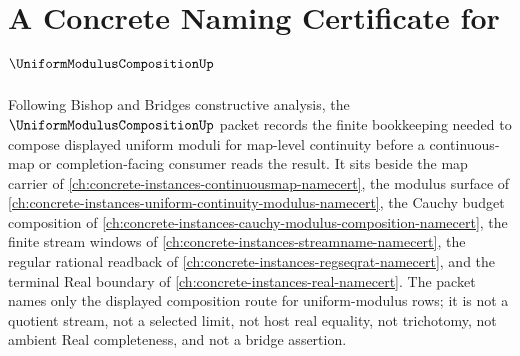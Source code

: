\chapter{A Concrete Naming Certificate for $\UniformModulusCompositionUp$}
\label{ch:concrete-instances-uniform-modulus-composition-namecert}

Following Bishop and Bridges constructive analysis, the $\UniformModulusCompositionUp$ packet records the finite bookkeeping needed to compose displayed uniform moduli for map-level continuity before a continuous-map or completion-facing consumer reads the result. It sits beside the map carrier of \autoref{ch:concrete-instances-continuousmap-namecert}, the modulus surface of \autoref{ch:concrete-instances-uniform-continuity-modulus-namecert}, the Cauchy budget composition of \autoref{ch:concrete-instances-cauchy-modulus-composition-namecert}, the finite stream windows of \autoref{ch:concrete-instances-streamname-namecert}, the regular rational readback of \autoref{ch:concrete-instances-regseqrat-namecert}, and the terminal Real boundary of \autoref{ch:concrete-instances-real-namecert}. The packet names only the displayed composition route for uniform-modulus rows; it is not a quotient stream, not a selected limit, not host real equality, not trichotomy, not ambient Real completeness, and not a bridge assertion.

